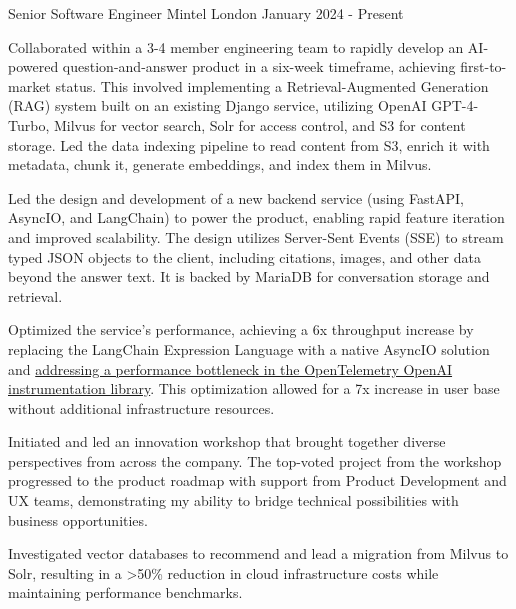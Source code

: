 \documentclass[11pt, a4paper]{awesome-cv}
\begin{document}


\begin{cventries}

  \cventry
    {Senior Software Engineer}
    {Mintel}
    {London}
    {January 2024 - Present}
    {
      \begin{cvitems}
        \item {Collaborated within a 3-4 member engineering team to rapidly develop an AI-powered question-and-answer product in a six-week timeframe, achieving first-to-market status. This involved implementing a Retrieval-Augmented Generation (RAG) system built on an existing Django service, utilizing OpenAI GPT-4-Turbo, Milvus for vector search, Solr for access control, and S3 for content storage. Led the data indexing pipeline to read content from S3, enrich it with metadata, chunk it, generate embeddings, and index them in Milvus.}
        \item {Led the design and development of a new backend service (using FastAPI, AsyncIO, and LangChain) to power the product, enabling rapid feature iteration and improved scalability. The design utilizes Server-Sent Events (SSE) to stream typed JSON objects to the client, including citations, images, and other data beyond the answer text. It is backed by MariaDB for conversation storage and retrieval.}
        \item {Optimized the service's performance, achieving a 6x throughput increase by replacing the LangChain Expression Language with a native AsyncIO solution and \href{https://leverstone.me/blog/performance-profiling-in-python-tools-techniques-and-an-unexpected-culprit}{addressing a performance bottleneck in the OpenTelemetry OpenAI instrumentation library}. This optimization allowed for a 7x increase in user base without additional infrastructure resources.}
        \item {Initiated and led an innovation workshop that brought together diverse perspectives from across the company. The top-voted project from the workshop progressed to the product roadmap with support from Product Development and UX teams, demonstrating my ability to bridge technical possibilities with business opportunities.}
        \item {Investigated vector databases to recommend and lead a migration from Milvus to Solr, resulting in a >50\% reduction in cloud infrastructure costs while maintaining performance benchmarks.}

\end{cvitems}}
\end{cventries}
\end{document}
